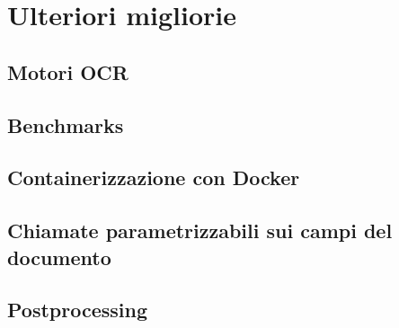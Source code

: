 \chapter{Ulteriori migliorie}
\label{improvements}

\section{Motori OCR}
\section{Benchmarks}
\section{Containerizzazione con Docker}
\section{Chiamate parametrizzabili sui campi del documento}
\section{Postprocessing}
